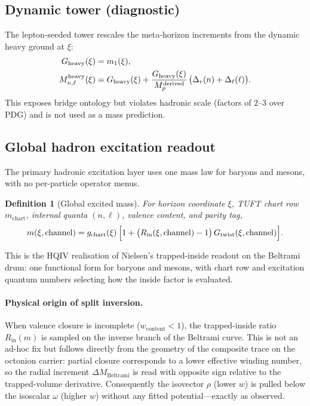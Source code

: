 \documentclass[11pt]{amsart}
\newtheorem{definition}[theorem]{Definition}
\begin{document}
\subsection{Dynamic tower (diagnostic)}

The lepton-seeded tower rescales the meta-horizon increments from the dynamic heavy ground at $\xi$:
\begin{align}
  G_{\rm heavy}(\xi) &= m_1(\xi), \\
  M_{n,\ell}^{\mathrm{heavy}}(\xi) &=
    G_{\rm heavy}(\xi) + \frac{G_{\rm heavy}(\xi)}{M_p^{\mathrm{derived}}}\,
    \bigl(\Delta_r(n) + \Delta_\ell(\ell)\bigr).
\end{align}
This exposes bridge ontology but violates hadronic scale (factors of $2$--$3$ over PDG) and is not used as a mass prediction.

\subsection{Global hadron excitation readout}
\label{sec:global-hadron}

The primary hadronic excitation layer uses one mass law for baryons and mesons, with no per-particle operator menus.

\begin{definition}[Global excited mass]
\label{def:global-mass}
For horizon coordinate $\xi$, TUFT chart row $m_{\mathrm{chart}}$, internal quanta $(n,\ell)$, valence content, and parity tag,
\begin{equation}
\label{eq:global-mass}
  m(\xi,\mathrm{channel})
  = g_{\mathrm{chart}}(\xi)\,
    \Bigl[1+\bigl(R_{\mathrm{in}}(\xi,\mathrm{channel})-1\bigr)\,
    G_{\mathrm{twist}}(\xi,\mathrm{channel})\Bigr].
\end{equation}
\end{definition}

This is the HQIV realisation of Nielsen's trapped-inside readout on the Beltrami drum: one functional form for baryons and mesons, with chart row and excitation quantum numbers selecting how the inside factor is evaluated.

\paragraph{Physical origin of split inversion.}
When valence closure is incomplete ($w_{\mathrm{content}}<1$), the trapped-inside ratio $R_{\mathrm{in}}(m)$ is sampled on the inverse branch of the Beltrami curve. This is not an ad-hoc fix but follows directly from the geometry of the composite trace on the octonion carrier: partial closure corresponds to a lower effective winding number, so the radial increment $\Delta M_{\mathrm{Beltrami}}$ is read with opposite sign relative to the trapped-volume derivative. Consequently the isovector $\rho$ (lower $w$) is pulled below the isoscalar $\omega$ (higher $w$) without any fitted potential---exactly as observed.
\end{document}
